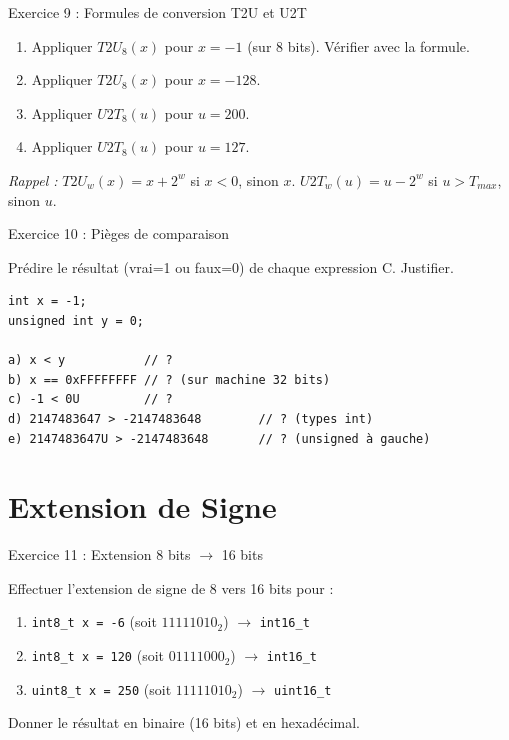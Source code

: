 \documentclass[10pt,a4paper]{article}
\begin{document}
\begin{exercicebox}{Exercice 9 : Formules de conversion T2U et U2T}

\begin{enumerate}[label=\alph*)]
    \item Appliquer $T2U_8(x)$ pour $x = -1$ (sur 8 bits). Vérifier avec la formule.
    \item Appliquer $T2U_8(x)$ pour $x = -128$.
    \item Appliquer $U2T_8(u)$ pour $u = 200$.
    \item Appliquer $U2T_8(u)$ pour $u = 127$.
\end{enumerate}

\textit{Rappel :} $T2U_w(x) = x + 2^w$ si $x < 0$, sinon $x$. \quad $U2T_w(u) = u - 2^w$ si $u > T_{max}$, sinon $u$.
\end{exercicebox}

\begin{exercicebox}{Exercice 10 : Pièges de comparaison}

Prédire le résultat (vrai=1 ou faux=0) de chaque expression C. Justifier.

\begin{lstlisting}[numbers=none]
int x = -1;
unsigned int y = 0;

a) x < y           // ?
b) x == 0xFFFFFFFF // ? (sur machine 32 bits)
c) -1 < 0U         // ?
d) 2147483647 > -2147483648        // ? (types int)
e) 2147483647U > -2147483648       // ? (unsigned à gauche)
\end{lstlisting}
\end{exercicebox}

\section{Extension de Signe}

\begin{exercicebox}{Exercice 11 : Extension 8 bits $\rightarrow$ 16 bits}

Effectuer l'extension de signe de 8 vers 16 bits pour :

\begin{enumerate}[label=\alph*)]
    \item \texttt{int8\_t x = -6} (soit $11111010_2$) $\rightarrow$ \texttt{int16\_t}
    \item \texttt{int8\_t x = 120} (soit $01111000_2$) $\rightarrow$ \texttt{int16\_t}
    \item \texttt{uint8\_t x = 250} (soit $11111010_2$) $\rightarrow$ \texttt{uint16\_t}
\end{enumerate}

Donner le résultat en binaire (16 bits) et en hexadécimal.
\end{exercicebox}
\end{document}
